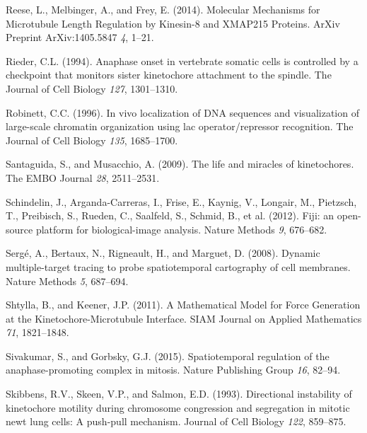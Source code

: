 \documentclass[12pt,a4paper,twoside,openright]{book}
\begin{document}
Reese, L., Melbinger, A., and Frey, E. (2014). Molecular Mechanisms for
Microtubule Length Regulation by Kinesin-8 and XMAP215 Proteins. ArXiv
Preprint ArXiv:1405.5847 \emph{4}, 1--21.

Rieder, C.L. (1994). Anaphase onset in vertebrate somatic cells is
controlled by a checkpoint that monitors sister kinetochore attachment
to the spindle. The Journal of Cell Biology \emph{127}, 1301--1310.

Robinett, C.C. (1996). In vivo localization of DNA sequences and
visualization of large-scale chromatin organization using lac
operator/repressor recognition. The Journal of Cell Biology \emph{135},
1685--1700.

Santaguida, S., and Musacchio, A. (2009). The life and miracles of
kinetochores. The EMBO Journal \emph{28}, 2511--2531.

Schindelin, J., Arganda-Carreras, I., Frise, E., Kaynig, V., Longair,
M., Pietzsch, T., Preibisch, S., Rueden, C., Saalfeld, S., Schmid, B.,
et al. (2012). Fiji: an open-source platform for biological-image
analysis. Nature Methods \emph{9}, 676--682.

Sergé, A., Bertaux, N., Rigneault, H., and Marguet, D. (2008). Dynamic
multiple-target tracing to probe spatiotemporal cartography of cell
membranes. Nature Methods \emph{5}, 687--694.

Shtylla, B., and Keener, J.P. (2011). A Mathematical Model for Force
Generation at the Kinetochore-Microtubule Interface. SIAM Journal on
Applied Mathematics \emph{71}, 1821--1848.

Sivakumar, S., and Gorbsky, G.J. (2015). Spatiotemporal regulation of
the anaphase-promoting complex in mitosis. Nature Publishing Group
\emph{16}, 82--94.

Skibbens, R.V., Skeen, V.P., and Salmon, E.D. (1993). Directional
instability of kinetochore motility during chromosome congression and
segregation in mitotic newt lung cells: A push-pull mechanism. Journal
of Cell Biology \emph{122}, 859--875.
\end{document}
